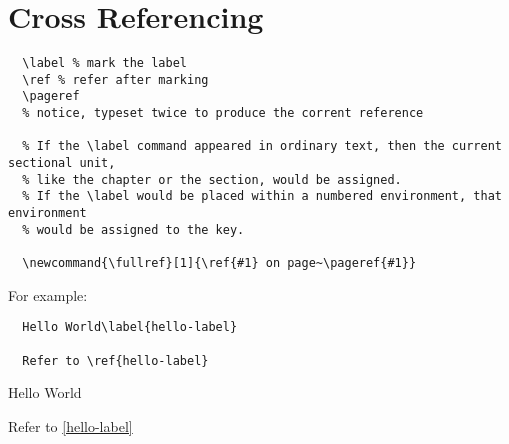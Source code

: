 \chapter{Cross Referencing}
\begin{lstlisting}
  \label % mark the label
  \ref % refer after marking
  \pageref
  % notice, typeset twice to produce the corrent reference

  % If the \label command appeared in ordinary text, then the current sectional unit,
  % like the chapter or the section, would be assigned.
  % If the \label would be placed within a numbered environment, that environment
  % would be assigned to the key.

  \newcommand{\fullref}[1]{\ref{#1} on page~\pageref{#1}}
\end{lstlisting}

For example:

\begin{lstlisting}
  Hello World\label{hello-label}

  Refer to \ref{hello-label}
\end{lstlisting}

\begin{tcolorbox}
Hello World\label{hello-label}

Refer to \ref{hello-label}
\end{tcolorbox}

